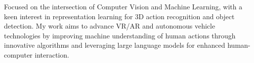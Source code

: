 


\begin{cventries}

\cvtext
{ %
\begin{cvitems}
    Focused on the intersection of Computer Vision and Machine Learning, with a keen interest in representation learning for 3D action recognition and object detection. 
    My work aims to advance VR/AR and autonomous vehicle technologies by improving machine understanding of human actions through innovative algorithms and leveraging large language models for enhanced human-computer interaction.
\end{cvitems}
}


\end{cventries}
